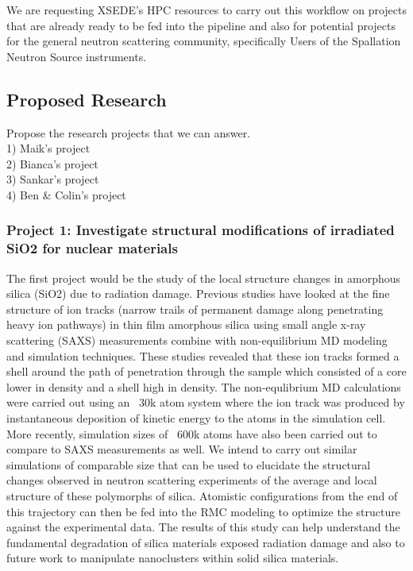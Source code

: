 \documentclass{proposalnsf}
\begin{document}
We are requesting XSEDE's HPC resources to carry out this workflow on projects that are already ready to be fed into the pipeline and also for potential projects for the general neutron scattering community, specifically Users of the Spallation Neutron Source instruments.

\subsection*{Proposed Research}

Propose the research projects that we can answer.  \\
  1) Maik's project \\
  2) Bianca's project \\
  3) Sankar's project \\
  4) Ben \& Colin's project \\

\subsubsection*{Project 1: Investigate structural modifications of irradiated SiO2 for nuclear materials}

The first project would be the study of the local structure changes in amorphous silica (SiO2) due to radiation damage. Previous studies have looked at the fine structure of ion tracks (narrow trails of permanent damage along penetrating heavy ion pathways) in thin film amorphous silica using small angle x-ray scattering (SAXS) measurements combine with non-equilibrium MD modeling and simulation techniques. These studies revealed that these ion tracks formed a shell around the path of penetration through the sample which consisted of a core lower in density and a shell high in density. The non-equlibrium MD calculations were carried out using an ~30k atom system where the ion track was produced by instantaneous deposition of kinetic energy to the atoms in the simulation cell. More recently, simulation sizes of ~600k atoms have also been carried out to compare to SAXS measurements as well. We intend to carry out similar simulations of comparable size that can be used to elucidate the structural changes observed in neutron scattering experiments of the average and local structure of these polymorphs of silica. Atomistic configurations from the end of this trajectory can then be fed into the RMC modeling to optimize the structure against the experimental data. The results of this study can help understand the fundamental degradation of silica materials exposed radiation damage and also to future work to manipulate nanoclusters within solid silica materials. 
\end{document}
